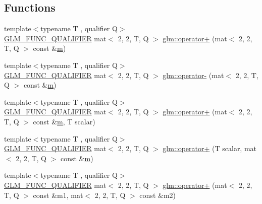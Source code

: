 \subsection*{Functions}
\begin{DoxyCompactItemize}
\item 
{\footnotesize template$<$typename T , qualifier Q$>$ }\\\mbox{\hyperlink{setup_8hpp_a33fdea6f91c5f834105f7415e2a64407}{G\+L\+M\+\_\+\+F\+U\+N\+C\+\_\+\+Q\+U\+A\+L\+I\+F\+I\+ER}} mat$<$ 2, 2, T, Q $>$ \mbox{\hyperlink{namespaceglm_ae58da6d122dbd410537502ee0a16f9cd}{glm\+::operator+}} (mat$<$ 2, 2, T, Q $>$ const \&\mbox{\hyperlink{_s_d_l__opengl__glext_8h_af593500c283bf1a787a6f947f503a5c2}{m}})
\item 
{\footnotesize template$<$typename T , qualifier Q$>$ }\\\mbox{\hyperlink{setup_8hpp_a33fdea6f91c5f834105f7415e2a64407}{G\+L\+M\+\_\+\+F\+U\+N\+C\+\_\+\+Q\+U\+A\+L\+I\+F\+I\+ER}} mat$<$ 2, 2, T, Q $>$ \mbox{\hyperlink{namespaceglm_a44be44a2be57ea0295081bec73df8f71}{glm\+::operator-\/}} (mat$<$ 2, 2, T, Q $>$ const \&\mbox{\hyperlink{_s_d_l__opengl__glext_8h_af593500c283bf1a787a6f947f503a5c2}{m}})
\item 
{\footnotesize template$<$typename T , qualifier Q$>$ }\\\mbox{\hyperlink{setup_8hpp_a33fdea6f91c5f834105f7415e2a64407}{G\+L\+M\+\_\+\+F\+U\+N\+C\+\_\+\+Q\+U\+A\+L\+I\+F\+I\+ER}} mat$<$ 2, 2, T, Q $>$ \mbox{\hyperlink{namespaceglm_a4985946dcd4a32193f3471a54a6bde94}{glm\+::operator+}} (mat$<$ 2, 2, T, Q $>$ const \&\mbox{\hyperlink{_s_d_l__opengl__glext_8h_af593500c283bf1a787a6f947f503a5c2}{m}}, T scalar)
\item 
{\footnotesize template$<$typename T , qualifier Q$>$ }\\\mbox{\hyperlink{setup_8hpp_a33fdea6f91c5f834105f7415e2a64407}{G\+L\+M\+\_\+\+F\+U\+N\+C\+\_\+\+Q\+U\+A\+L\+I\+F\+I\+ER}} mat$<$ 2, 2, T, Q $>$ \mbox{\hyperlink{namespaceglm_ae044e0d44472e5ce496c101a346995fa}{glm\+::operator+}} (T scalar, mat$<$ 2, 2, T, Q $>$ const \&\mbox{\hyperlink{_s_d_l__opengl__glext_8h_af593500c283bf1a787a6f947f503a5c2}{m}})
\item 
{\footnotesize template$<$typename T , qualifier Q$>$ }\\\mbox{\hyperlink{setup_8hpp_a33fdea6f91c5f834105f7415e2a64407}{G\+L\+M\+\_\+\+F\+U\+N\+C\+\_\+\+Q\+U\+A\+L\+I\+F\+I\+ER}} mat$<$ 2, 2, T, Q $>$ \mbox{\hyperlink{namespaceglm_af64684c1a1aba33f75b3bb9e116df931}{glm\+::operator+}} (mat$<$ 2, 2, T, Q $>$ const \&m1, mat$<$ 2, 2, T, Q $>$ const \&m2)

\end{DoxyCompactItemize}
